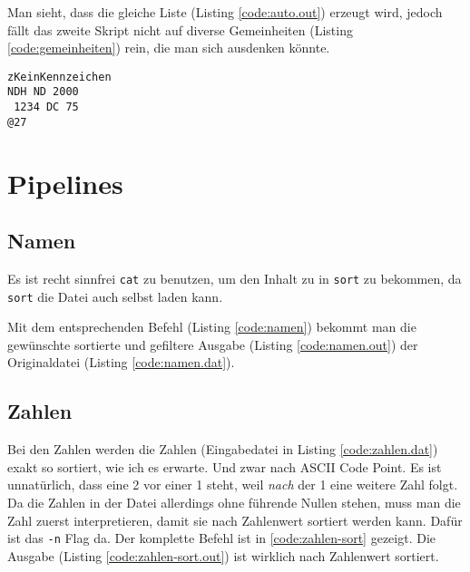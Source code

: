 



Man sieht, dass die gleiche Liste (Listing \ref{code:auto.out}) erzeugt wird, jedoch fällt das zweite Skript nicht auf diverse Gemeinheiten (Listing \ref{code:gemeinheiten}) rein, die man sich ausdenken könnte.

\begin{lstlisting}[caption=Gemeinheiten für Listing \ref{code:auto-einfach}, label=code:gemeinheiten, float=htb]
zKeinKennzeichen
NDH ND 2000
 1234 DC 75
@27
\end{lstlisting}

\section{Pipelines}
\subsection{Namen}


Es ist recht sinnfrei \texttt{cat} zu benutzen, um den Inhalt zu in \texttt{sort} zu bekommen, da \texttt{sort} die Datei auch selbst laden kann.

Mit dem entsprechenden Befehl (Listing \ref{code:namen}) bekommt man die gewünschte sortierte und gefiltere Ausgabe (Listing \ref{code:namen.out}) der Originaldatei (Listing \ref{code:namen.dat}).




\subsection{Zahlen}



Bei den Zahlen werden die Zahlen (Eingabedatei in Listing \ref{code:zahlen.dat}) exakt so sortiert, wie ich es erwarte. Und zwar nach ASCII Code Point. Es ist unnatürlich, dass eine 2 vor einer 1 steht, weil \textit{nach} der 1 eine weitere Zahl folgt. Da die Zahlen in der Datei allerdings ohne führende Nullen stehen, muss man die Zahl zuerst interpretieren, damit sie nach Zahlenwert sortiert werden kann. Dafür ist das \texttt{-n} Flag da. Der komplette Befehl ist in \ref{code:zahlen-sort} gezeigt. Die Ausgabe (Listing \ref{code:zahlen-sort.out}) ist wirklich nach Zahlenwert sortiert.

